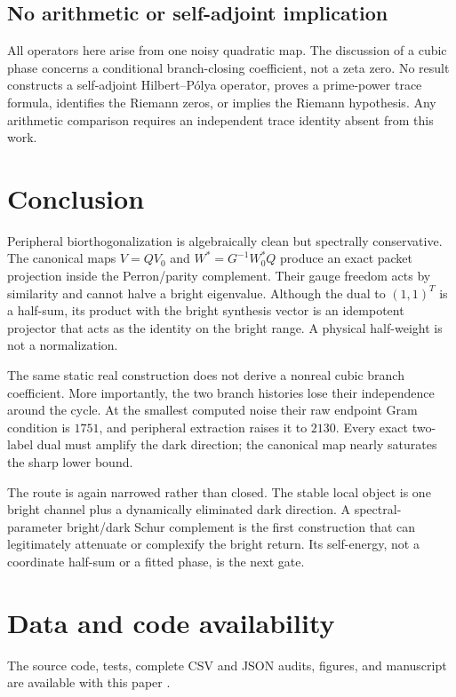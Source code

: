 \documentclass[11pt]{article}
\theoremstyle{definition}
\theoremstyle{remark}
\begin{document}
\subsection{No arithmetic or self-adjoint implication}

All operators here arise from one noisy quadratic map.  The discussion of a
cubic phase concerns a conditional branch-closing coefficient, not a zeta
zero.  No result constructs a self-adjoint Hilbert--P\'olya operator, proves a
prime-power trace formula, identifies the Riemann zeros, or implies the
Riemann hypothesis.  Any arithmetic comparison requires an independent
trace identity absent from this work.

\section{Conclusion}

Peripheral biorthogonalization is algebraically clean but spectrally
conservative.  The canonical maps $V=QV_0$ and
$W^*=G^{-1}W_0^*Q$ produce an exact packet projection inside the
Perron/parity complement.  Their gauge freedom acts by similarity and cannot
halve a bright eigenvalue.  Although the dual to $(1,1)^T$ is a half-sum, its
product with the bright synthesis vector is an idempotent projector that
acts as the identity on the bright range.  A physical half-weight is not a
normalization.

The same static real construction does not derive a nonreal cubic branch
coefficient.  More importantly, the two branch histories lose their
independence around the cycle.  At the smallest computed noise their raw
endpoint Gram condition is $1751$, and peripheral extraction raises it to
$2130$.  Every exact two-label dual must amplify the dark direction; the
canonical map nearly saturates the sharp lower bound.

The route is again narrowed rather than closed.  The stable local object is
one bright channel plus a dynamically eliminated dark direction.  A
spectral-parameter bright/dark Schur complement is the first construction
that can legitimately attenuate or complexify the bright return.  Its
self-energy, not a coordinate half-sum or a fitted phase, is the next gate.

\section*{Data and code availability}

The source code, tests, complete CSV and JSON audits, figures, and manuscript
are available with this paper \citep{WangBiorthogonalCode2026}.



\end{document}
